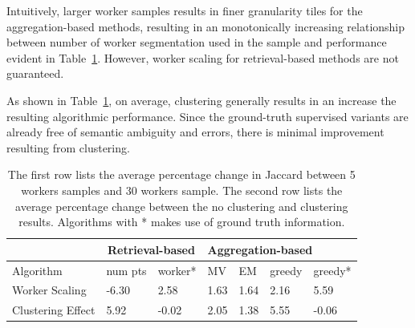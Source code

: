 \par \noindent Intuitively, larger worker samples results in finer granularity tiles for the aggregation-based methods, resulting in an monotonically increasing relationship between number of worker segmentation used in the sample and performance evident in Table~\ref{statsTable}. However, worker scaling for retrieval-based methods are not guaranteed.

\par \noindent As shown in Table~\ref{statsTable}, on average, clustering generally results in an increase the resulting algorithmic performance. Since the ground-truth supervised variants are already free of semantic ambiguity and errors, there is minimal improvement resulting from clustering. %

\begin{table}[h!]
   \small
     \setlength\tabcolsep{1.5pt}
      \begin{tabular}{l|l|l|l|l|l|l}
         & \multicolumn{2}{c|}{Retrieval-based} & \multicolumn{4}{l}{Aggregation-based} \\ \hline
      Algorithm         & num pts         & worker*        & MV    & EM    & greedy  & greedy*  \\ \hline
      Worker Scaling    & -6.30           & 2.58               & 1.63  & 1.64  & 2.16    & 5.59         \\ \hline
      Clustering Effect & 5.92            & -0.02              & 2.05  & 1.38  & 5.55    & -0.06       
      \end{tabular}
      \caption{The first row lists the average percentage change in Jaccard between 5 workers samples and 30 workers sample. The second row lists the average percentage change between the no clustering and clustering results. Algorithms with * makes use of ground truth information.}
      \label{statsTable}
\end{table}
\vspace{-10pt}
